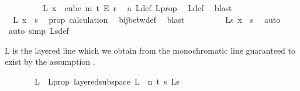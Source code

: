 \begin{isabellebody}
\ \ \ \ \ \ \isamarkupfalse%
\ \isamarkupfalse%
\ {\isachardoublequoteopen}{\isasymchi}L\ x\ {\isasymin}\ {\isacharparenleft}{\kern0pt}cube\ m\ {\isacharparenleft}{\kern0pt}t{\isacharplus}{\kern0pt}{}{\isacharparenright}{\kern0pt}\ {\isasymrightarrow}\isactrlsub E\ {\isacharbraceleft}{\kern0pt}{\isachardot}{\kern0pt}{\isachardot}{\kern0pt}{\isacharless}{\kern0pt}r{\isacharbraceright}{\kern0pt}{\isacharparenright}{\kern0pt}{\isachardoublequoteclose}\ \isamarkupfalse%
\ a\ {\isasymchi}L{\isacharunderscore}{\kern0pt}def\ {\isasymchi}L{\isacharunderscore}{\kern0pt}prop\ \isamarkupfalse%
\ {\isasymchi}L{\isacharunderscore}{\kern0pt}def\ \isamarkupfalse%
\ blast\isanewline
\ \ \ \ \ \ \isamarkupfalse%
\ \isamarkupfalse%
\ {\isachardoublequoteopen}{\isasymphi}\ {\isacharparenleft}{\kern0pt}{\isasymchi}L\ x{\isacharparenright}{\kern0pt}\ {\isasymin}\ {\isacharbraceleft}{\kern0pt}{\isachardot}{\kern0pt}{\isachardot}{\kern0pt}{\isacharless}{\kern0pt}s{\isacharbraceright}{\kern0pt}{\isachardoublequoteclose}\ \isamarkupfalse%
\ {\isasymphi}{\isacharunderscore}{\kern0pt}prop\ calculation{\isacharparenleft}{\kern0pt}{}{\isacharparenright}{\kern0pt}\ \isamarkupfalse%
\ bij{\isacharunderscore}{\kern0pt}betw{\isacharunderscore}{\kern0pt}def\ \isamarkupfalse%
\ blast\isanewline
\ \ \ \ \ \ \isamarkupfalse%
\ \isamarkupfalse%
\ {\isachardoublequoteopen}{\isasymchi}L{\isacharunderscore}{\kern0pt}s\ x\ {\isasymin}\ {\isacharbraceleft}{\kern0pt}{\isachardot}{\kern0pt}{\isachardot}{\kern0pt}{\isacharless}{\kern0pt}s{\isacharbraceright}{\kern0pt}{\isachardoublequoteclose}\ \isamarkupfalse%
\ auto\isanewline
\ \ \ \ \isamarkupfalse%
\ {\isacharparenleft}{\kern0pt}auto\ simp{\isacharcolon}{\kern0pt}\ {\isasymchi}L{\isacharunderscore}{\kern0pt}s{\isacharunderscore}{\kern0pt}def{\isacharparenright}{\kern0pt}%
\begin{isamarkuptext}%
L is the layered line which we obtain from the monochromatic line guaranteed to exist by the assumption .%
\end{isamarkuptext}\isamarkuptrue%
\ \ \ \ \isamarkupfalse%
\ \isamarkupfalse%
\ L\ \ L{\isacharunderscore}{\kern0pt}prop{\isacharcolon}{\kern0pt}\ {\isachardoublequoteopen}layered{\isacharunderscore}{\kern0pt}subspace\ L\ {}\ n\ t\ s\ {\isasymchi}L{\isacharunderscore}{\kern0pt}s{\isachardoublequoteclose}\ \isamarkupfalse%

\end{isabellebody}
